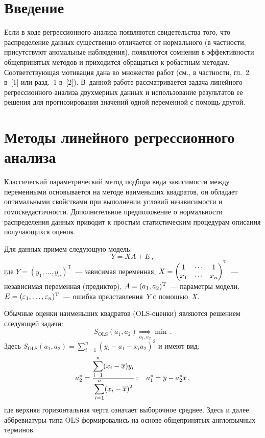       \begin{multicols}{2}

            \label{st\stat}

\section{Введение}

     Если в ходе регрессионного анализа появляются свидетельства того, что
распределение данных существенно отличается от нормального (в част\-ности,
присутствуют аномальные наблюдения), появляют\-ся сомнения в
эффективности общепринятых методов и приходится обращаться к робастным
методам. Соответствующая мотивация дана во множестве работ (см., в
частности, гл.~2 в~[1] или разд.~1 в~[2]). В~данной работе рассматривается
задача линейного регрессионного анализа двухмерных данных и использование
результатов ее решения для прогнозирования значений одной переменной с
помощь другой.

\section{Методы линейного регрессионного анализа}

     Классический параметрический метод подбора вида зависимости между
переменными основывается на методе наименьших квадратов, он обладает
оптимальными свойствами при выполнении условий независимости и
гомоскедастичности. Дополнительное предположение о нормальности
распределения данных приводит к простым статистическим процедурам
описания получающихся оценок.

     Для данных примем следующую модель:
     $$
     Y=XA+E\,,
     $$
где $Y=(y_1, \ldots , y_n)^{\mathrm{T}}$~--- зависимая переменная, $X\hm=
\begin{pmatrix} 1 & \cdots & 1\\
x_1 & \cdots & x_n\end{pmatrix}^{\mathrm{^T}}$~--- независимая переменная
(предиктор), $A\hm= (a_1, a_2)^{\mathrm{T}}$~--- параметры модели, $E\hm=
(\varepsilon_1, \ldots , \varepsilon_n )^{\mathrm{T}}$~--- ошибка
представления~$Y$ с \mbox{помощью}~$X$.

     Обычные оценки наименьших квадратов (OLS-оцен\-ки) являются
решением следующей задачи:
     \begin{equation*}
     S_{\mathrm{OLS}}(a_1, a_2)
     \underset{a_1,a_2}{\Longrightarrow} \min\,.
     \end{equation*}
Здесь
     $S_{\mathrm{OLS}} (a_1,a_2) =\sum\limits_{i=1}^n (y_i -a_1 -x_ia_2)^2$
и имеют вид:
$$
a_2^* = \displaystyle\frac{\displaystyle \sum\limits_{i=1}^n (x_i -\overline{x})y_i\mathstrut}{\displaystyle \sum\limits_{i=1}^n (x_i-
\overline{x} )^2\mathstrut}\,;\quad a_1^*=\overline{y}-a_2^*\overline{x}\,,
$$
где верхняя горизонтальная черта означает выборочное среднее. Здесь и далее
аббревиатуры типа OLS формировались на основе общепринятых
англоязычных терминов.


\end{multicols}

